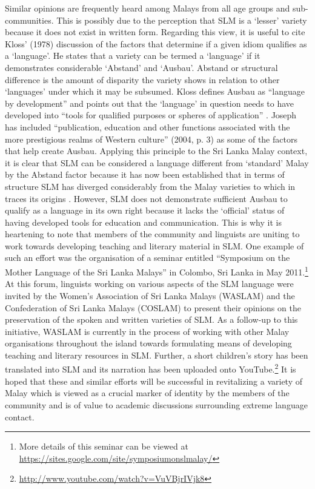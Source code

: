 Similar opinions are frequently heard among Malays from all age groups and sub-communities. This is possibly due to the perception that SLM is a `lesser' variety because it does not exist in written form. Regarding this view, it is useful to cite Kloss' (1978) \nocite{KlossEtAl1978} discussion of the factors that determine if a given idiom qualifies as a `language'. He states that a variety can be termed a `language' if it demonstrates considerable `Abstand' and `Ausbau'. Abstand or structural difference is the amount of disparity the variety shows in relation to other `languages' under which it may be subsumed. Kloss defines Ausbau as ``language by development'' and points out that the `language' in question needs to have developed into ``tools for qualified purposes or spheres of application'' \citep[25]{KlossEtAl1978}. Joseph has included ``publication, education and other functions associated with the more prestigious realms of Western culture'' (2004, p. 3) as some of the factors that help create Ausbau. Applying this principle to the Sri Lanka Malay context, it is clear that SLM can be considered a language different from `standard' Malay by the Abstand factor because it has now been established that in terms of structure SLM has diverged considerably from the Malay varieties to which in traces its origins \citep{Adelaar1991}. However, SLM does not demonstrate sufficient Ausbau to qualify as a language in its own right because it lacks the `official' status of having developed tools for education and communication. This is why it is heartening to note that members of the community and linguists are uniting to work towards developing teaching and literary material in SLM. One example of such an effort was the organisation of a seminar entitled ``Symposium on the Mother Language of the Sri Lanka Malays'' in Colombo, Sri Lanka in May 2011.\footnote{More 
 details of this seminar can be viewed at \url{https://sites.google.com/site/symposiumonslmalay/} 
}
At this forum, linguists working on various aspects of the SLM language were invited by the Women's Association of Sri Lanka Malays (WASLAM) and the Confederation of Sri Lanka Malays (COSLAM) to present their opinions on the preservation of the spoken and written varieties of SLM. As a follow-up to this initiative, WASLAM is currently in the process of working with other Malay organisations throughout the island towards formulating means of developing teaching and literary resources in SLM. Further, a short children's story has been translated into SLM and its narration has been uploaded onto YouTube.\footnote{
 \url{http://www.youtube.com/watch?v=VuVBjrIVjk8} 
}
It is hoped that these and similar efforts will be successful in revitalizing a variety of Malay which is viewed as a crucial marker of identity by the members of the community and is of value to academic discussions surrounding extreme language contact. 

